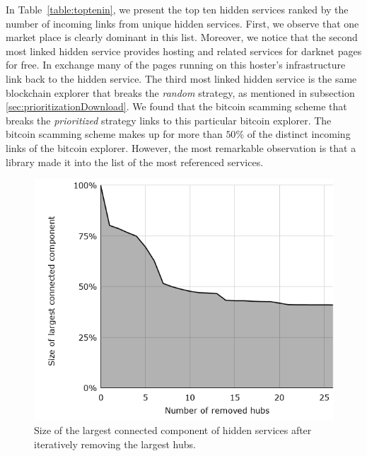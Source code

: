 In Table~\ref{table:toptenin}, we present the top ten hidden services ranked by the number of incoming links from unique hidden services. 
First, we observe that one market place is clearly dominant in this list. 
Moreover, we notice that the second most linked hidden service provides hosting and related services for darknet pages for free. In exchange many of the pages running on this hoster's infrastructure link back to the hidden service. 
The third most linked hidden service is the same blockchain explorer that breaks the \emph{random} strategy, as mentioned in subsection \ref{sec:prioritizationDownload}. 
We found that the bitcoin scamming scheme that breaks the \emph{prioritized} strategy links to this particular bitcoin explorer. The bitcoin scamming scheme makes up for more than $50\%$ of the distinct incoming links of the bitcoin explorer.
However, the most remarkable observation is that a library made it into the list of the most referenced services.

\ifdgruyter
  \begin{figure}[H]
  \includegraphics[width=\linewidth]{images/LinkhubsRemoval.png}
  \caption{Size of the largest connected component of hidden services after iteratively removing the largest hubs.}
  \label{fig:largestConnectedComponent}
  \end{figure}
\fi


